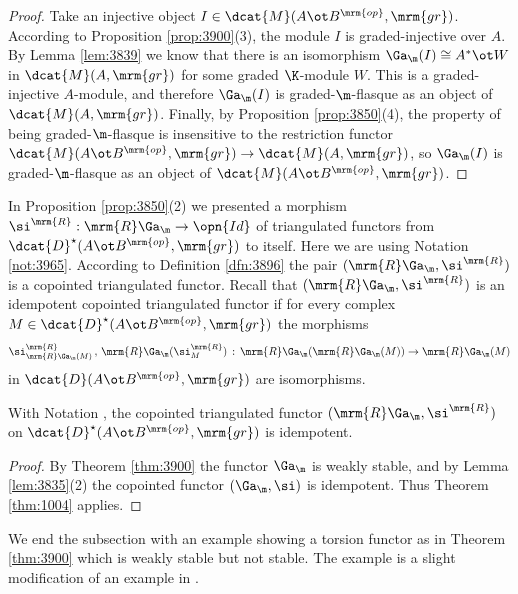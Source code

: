\begin{proof}
Take an injective object $I \in \dcat{M}(A \ot B^{\mrm{op}}, \mrm{gr})$. 
According to Proposition \ref{prop:3900}(3), the module $I$ is 
graded-injective over $A$. By Lemma \ref{lem:3839} we know that 
there is an isomorphism 
$\Ga_{\m}(I) \cong A^* \ot W$
in $\dcat{M}(A, \mrm{gr})$ for some graded $\K$-module $W$. This is a 
graded-injective $A$-module, and 
therefore $\Ga_{\m}(I)$ is graded-$\m$-flasque as an object of 
$\dcat{M}(A, \mrm{gr})$. 
Finally, by Proposition \ref{prop:3850}(4), the property of being 
graded-$\m$-flasque is insensitive to the restriction functor 
$\dcat{M}(A \ot B^{\mrm{op}}, \mrm{gr}) \to \dcat{M}(A, \mrm{gr})$,
so $\Ga_{\m}(I)$ is graded-$\m$-flasque as an object of 
$\dcat{M}(A \ot B^{\mrm{op}}, \mrm{gr})$. 
\end{proof}

In Proposition \ref{prop:3850}(2) we presented a morphism 
$\si^{\mrm{R}}_{} : \mrm{R} \Ga_{\m} \to \opn{Id}$
of triangulated functors from 
$\dcat{D}^{\star}(A \ot B^{\mrm{op}}, \mrm{gr})$
to itself. Here we are using Notation \ref{not:3965}. 
According to Definition \ref{dfn:3896} the pair 
$(\mrm{R} \Ga_{\m}, \si^{\mrm{R}})$ 
is a copointed triangulated functor. Recall that 
$(\mrm{R} \Ga_{\m}, \si^{\mrm{R}})$ is an 
idempotent copointed triangulated functor 
if for every complex
$M \in \dcat{D}^{\star}(A \ot B^{\mrm{op}}, \mrm{gr})$
the morphisms 
\[ \si^{\mrm{R}}_{\mrm{R} \Ga_{\m}(M)} \, , \,   
\mrm{R} \Ga_{\m}(\si^{\mrm{R}}_{M}) \, : \,
\mrm{R} \Ga_{\m}(\mrm{R} \Ga_{\m}(M)) \to \mrm{R} \Ga_{\m}(M) \]
in $\dcat{D}(A \ot B^{\mrm{op}}, \mrm{gr})$
are isomorphisms. 

\begin{cor} \label{cor:3966}
With Notation \tup{\ref{not:3965}}, the copointed triangulated functor 
$(\mrm{R} \Ga_{\m}, \si^{\mrm{R}})$
on $\dcat{D}^{\star}(A \ot B^{\mrm{op}}, \mrm{gr})$ is idempotent.
\end{cor}

\begin{proof}
By Theorem \ref{thm:3900} the functor $\Ga_{\m}$ is weakly stable, and 
by Lemma \ref{lem:3835}(2) the copointed functor $(\Ga_{\m}, \si)$ is 
idempotent. Thus Theorem \ref{thm:1004} applies. 
\end{proof}

We end the subsection with an example showing a torsion functor as in 
Theorem \ref{thm:3900} which is weakly stable but not stable.
The example is a slight modification of an example in \cite{VyYe}. 

